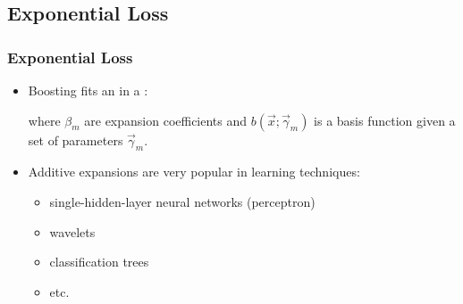 

\subsection{Exponential Loss}

\begin{frame}
  \frametitle{Exponential Loss}

  \begin{itemize}
    \item Boosting fits an  in a : \\[.1cm]
      \begin{center}
      \end{center}
      \vspace{.1cm}
      where $\beta_m$ are expansion coefficients and $b(\vec x ; \vec \gamma_m)$ is a basis function given a set of parameters $\vec \gamma_m$. \\[.3cm] \pause
    \item Additive expansions are very popular in learning techniques:
      \begin{itemize}
        \item single-hidden-layer neural networks (perceptron)
        \item wavelets
        \item classification trees
        \item etc.
      \end{itemize}
  \end{itemize}
\end{frame}


